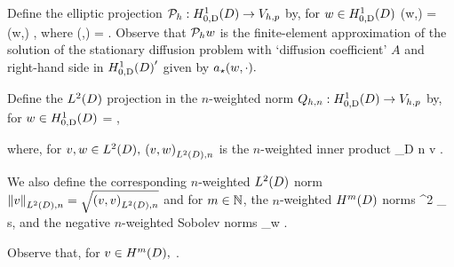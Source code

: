 Define the elliptic projection $\Ph:\HozDD\rightarrow\Vhp$ by, for $w \in \HozDD$
\beq\label{eq:epdef}
\aep(\Ph w,\vh) = \aep(w,\vh) \tforall \vh \in \Vhp,
  \eeq
  where
  \beq\label{eq:aepdef}
  \aep(\vo,\vt) = \IPLtD{\grad \vo}{\grad \vt}.
  \eeq
  Observe that $\mathcal P_{h} w$ is the finite-element approximation of the solution of the stationary diffusion problem with `diffusion coefficient' $A$ and right-hand side in $\HozDD'$ given by $a_{\star}(w,\cdot).$
  
Define the $\LtD$ projection in the $n$-weighted norm $\Qhn:\HozDD\rightarrow \Vhp$ by, for $w \in \HozDD$
\beqs
{} =  \tforall \vh \in \Vhp,
\eeqs

where, for $v,w \in \LtD,$ $\IPLtDn{v}{w}$ is the $n$-weighted inner product
\beqs
{} \de \int_{D} n v \wbar.
\eeqs

We also define the corresponding $n$-weighted $\LtD$ norm $\NLtDn{v} = \sqrt{\IPLtDn{v}{v}}$ and for $m \in \mathbb N$, the $n$-weighted $\HmD$ norms
\beqs
{}^2 \de \sum_{\alpha \st \abs{\alpha} \leq s},
\eeqs
and the negative $n$-weighted Sobolev norms
\beq\label{eq:negweightnorm}
 \de \sup_{w \in \HmD} .
\eeq

Observe that, for $v \in \HmD,$
\beq\label{eq:nconv}
\nmin{} \leq {} \leq \nmax {}.
\eeq

